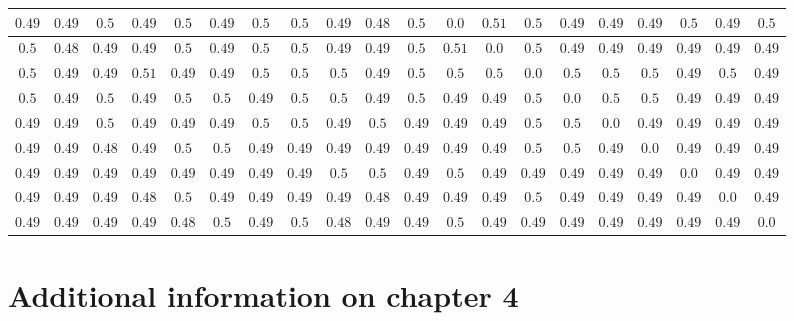 \begin{table}[h!]
{\begin{tabular}{cccccccccccccccccccc}
$0.49$ & $0.49$ & $0.5$ & $0.49$ & $0.5$ & $0.49$ & $0.5$ & $0.5$ & $0.49$ & $0.48$ & $0.5$ & $0.0$ & $0.51$ & $0.5$ & $0.49$ & $0.49$ & $0.49$ & $0.5$ & $0.49$ & $0.5$\\ \hline
$0.5$ & $0.48$ & $0.49$ & $0.49$ & $0.5$ & $0.49$ & $0.5$ & $0.5$ & $0.49$ & $0.49$ & $0.5$ & $0.51$ & $0.0$ & $0.5$ & $0.49$ & $0.49$ & $0.49$ & $0.49$ & $0.49$ & $0.49$\\ \hline
$0.5$ & $0.49$ & $0.49$ & $0.51$ & $0.49$ & $0.49$ & $0.5$ & $0.5$ & $0.5$ & $0.49$ & $0.5$ & $0.5$ & $0.5$ & $0.0$ & $0.5$ & $0.5$ & $0.5$ & $0.49$ & $0.5$ & $0.49$\\ \hline
$0.5$ & $0.49$ & $0.5$ & $0.49$ & $0.5$ & $0.5$ & $0.49$ & $0.5$ & $0.5$ & $0.49$ & $0.5$ & $0.49$ & $0.49$ & $0.5$ & $0.0$ & $0.5$ & $0.5$ & $0.49$ & $0.49$ & $0.49$\\ \hline
$0.49$ & $0.49$ & $0.5$ & $0.49$ & $0.49$ & $0.49$ & $0.5$ & $0.5$ & $0.49$ & $0.5$ & $0.49$ & $0.49$ & $0.49$ & $0.5$ & $0.5$ & $0.0$ & $0.49$ & $0.49$ & $0.49$ & $0.49$\\ \hline
$0.49$ & $0.49$ & $0.48$ & $0.49$ & $0.5$ & $0.5$ & $0.49$ & $0.49$ & $0.49$ & $0.49$ & $0.49$ & $0.49$ & $0.49$ & $0.5$ & $0.5$ & $0.49$ & $0.0$ & $0.49$ & $0.49$ & $0.49$\\ \hline
$0.49$ & $0.49$ & $0.49$ & $0.49$ & $0.49$ & $0.49$ & $0.49$ & $0.49$ & $0.5$ & $0.5$ & $0.49$ & $0.5$ & $0.49$ & $0.49$ & $0.49$ & $0.49$ & $0.49$ & $0.0$ & $0.49$ & $0.49$\\ \hline
$0.49$ & $0.49$ & $0.49$ & $0.48$ & $0.5$ & $0.49$ & $0.49$ & $0.49$ & $0.49$ & $0.48$ & $0.49$ & $0.49$ & $0.49$ & $0.5$ & $0.49$ & $0.49$ & $0.49$ & $0.49$ & $0.0$ & $0.49$\\ \hline
$0.49$ & $0.49$ & $0.49$ & $0.49$ & $0.48$ & $0.5$ & $0.49$ & $0.5$ & $0.48$ & $0.49$ & $0.49$ & $0.5$ & $0.49$ & $0.49$ & $0.49$ & $0.49$ & $0.49$ & $0.49$ & $0.49$ & $0.0$
\end{tabular}}
\end{table}
\chapter{Additional information on chapter 4}\label{app:chp4}